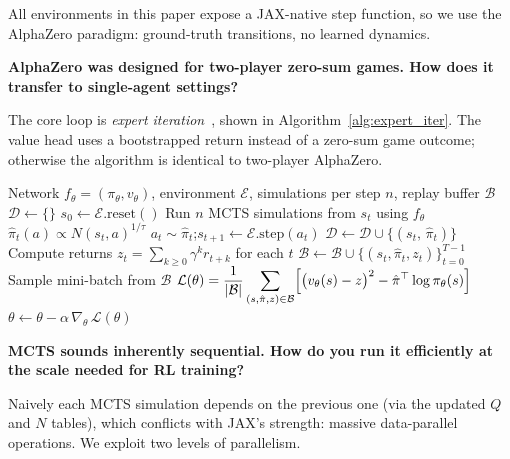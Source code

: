 All environments in this paper expose a JAX-native step function, so we use the
AlphaZero paradigm: ground-truth transitions, no learned dynamics.

\textbf{AlphaZero was designed for two-player zero-sum games. How does it transfer to single-agent settings?}

The core loop is \emph{expert iteration}~\cite{anthony2021expert},
shown in Algorithm~\ref{alg:expert_iter}.
The value head uses a bootstrapped return instead of a zero-sum game outcome;
otherwise the algorithm is identical to two-player AlphaZero.

\begin{algorithm}[h]
\caption{Single-agent AlphaZero via Expert Iteration}
\label{alg:expert_iter}
\begin{algorithmic}[1]
\Require Network $f_\theta = (\pi_\theta, v_\theta)$, environment $\mathcal{E}$,
         simulations per step $n$, replay buffer $\mathcal{B}$
\Repeat
  \State $\mathcal{D} \leftarrow \{\}$ 
  \State $s_0 \leftarrow \mathcal{E}.\text{reset}()$
                       
    \State Run $n$ MCTS simulations from $s_t$ using $f_\theta$
    \State $\hat{\pi}_t(a) \propto N(s_t, a)^{1/\tau}$ 
    \State $a_t \sim \hat{\pi}_t$;\quad $s_{t+1} \leftarrow \mathcal{E}.\text{step}(a_t)$
    \State $\mathcal{D} \leftarrow \mathcal{D} \cup \{(s_t,\, \hat{\pi}_t)\}$
  \EndFor
  \State Compute returns $z_t = \sum_{k \geq 0} \gamma^k r_{t+k}$ for each $t$ 
  \State $\mathcal{B} \leftarrow \mathcal{B} \cup \{(s_t, \hat{\pi}_t, z_t)\}_{t=0}^{T-1}$
  \State Sample mini-batch from $\mathcal{B}$                     
  \State $\mathcal{L}(\theta) =
    \displaystyle\frac{1}{|\mathcal{B}|}\sum_{(s,\hat{\pi},z)\in\mathcal{B}}
    \Bigl[\bigl(v_\theta(s) - z\bigr)^2
          - \hat{\pi}^\top \log \pi_\theta(s)\Bigr]$
  \State $\theta \leftarrow \theta - \alpha\,\nabla_\theta\,\mathcal{L}(\theta)$
\end{algorithmic}
\end{algorithm}


\textbf{MCTS sounds inherently sequential. How do you run it efficiently at the scale needed for RL training?}

Naively each MCTS simulation depends on the previous one (via the updated $Q$ and $N$
tables), which conflicts with JAX's strength: massive data-parallel operations.
We exploit two levels of parallelism.

